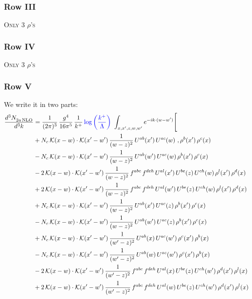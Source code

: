 \documentclass[9pt]{article}
\numberwithin{equation}{section}
\begin{document}
\subsubsection{Row III}
\textsc{Only 3 $\rho$'s}
\subsubsection{Row IV}
\textsc{Only 3 $\rho$'s}
\subsubsection{Row V}
We write it in two parts: 
\begin{align}
    \frac{d^{3}N_{2a\,\rm NLO}^{\rm}}{d^{3}k}  & = \frac{1}{(2\pi)^{3}}\,\frac{g^{4}}{16\pi^{5}}\,\frac{1}{k^{+}}\,{\color{blue}\log{\left(\frac{k^{+}}{\Lambda}\right)}}\,\,\int_{x,x',z,w,w'}e^{-ik\cdot(w-w')}\Bigg[\notag\\
&+N_{c}\,\mathcal{K}(x-w)\cdot\mathcal{K}(x'-w')\,\frac{1}{(w-z)^{2}}\,U^{ab}(x')\,U^{ac}(w)\  ,\rho^{b}(x')\,\rho^{c}(x)\notag\\
&-N_{c}\,\mathcal{K}(x-w)\cdot\mathcal{K}(x'-w')\,\frac{1}{(w-z)^{2}}\,U^{ab}(w')\,U^{ac}(w)\,\rho^{b}(x')\,\rho^{c}(x)\notag\\
&-2\,\mathcal{K}(x-w)\cdot\mathcal{K}(x'-w')\,\frac{1}{(w-z)^{2}}\,f^{abc}\,f^{deh}\,U^{al}(x')\,U^{be}(z)\,U^{ch}(w)\,\rho^{l}(x')\,\rho^{d}(x)\notag\\
&+2\,\mathcal{K}(x-w)\cdot\mathcal{K}(x'-w')\,\frac{1}{(w-z)^{2}}\,f^{abc}\,f^{deh}\,U^{al}(w')\,U^{be}(z)\,U^{ch}(w)\,\rho^{l}(x')\,\rho^{d}(x)\notag\\
&+N_{c}\,\mathcal{K}(x-w)\cdot\mathcal{K}(x'-w')\,\frac{1}{(w-z)^{2}}\,U^{ab}(x')\,U^{ac}(z)\,\rho^{b}(x')\,\rho^{c}(x)\notag\\
&-N_{c}\,\mathcal{K}(x-w)\cdot\mathcal{K}(x'-w')\,\frac{1}{(w-z)^{2}}\,U^{ab}(w')\,U^{ac}(z)\,\rho^{b}(x')\,\rho^{c}(x)\notag\\
&+N_{c}\,\mathcal{K}(x-w)\cdot\mathcal{K}(x'-w')\,\frac{1}{(w'-z)^{2}}\,U^{ab}(x)\,U^{ac}(w')\,\rho^{c}(x')\,\rho^{b}(x)\notag\\
&-N_{c}\,\mathcal{K}(x-w)\cdot\mathcal{K}(x'-w')\,\frac{1}{(w'-z)^{2}}\,U^{ab}(w)\,U^{ac}(w')\,\rho^{c}(x')\,\rho^{b}(x)\notag\\
&-2\,\mathcal{K}(x-w)\cdot\mathcal{K}(x'-w')\,\frac{1}{(w'-z)^{2}}\,f^{abc}\,f^{deh}\,U^{al}(x)\,U^{be}(z)\,U^{ch}(w')\,\rho^{d}(x')\,\rho^{l}(x)\notag\\
&+2\,\mathcal{K}(x-w)\cdot\mathcal{K}(x'-w')\,\frac{1}{(w'-z)^{2}}\,f^{abc}\,f^{deh}\,U^{al}(w)\,U^{be}(z)\,U^{ch}(w')\,\rho^{d}(x')\,\rho^{l}(x)\notag\\

\end{align}
\end{document}
